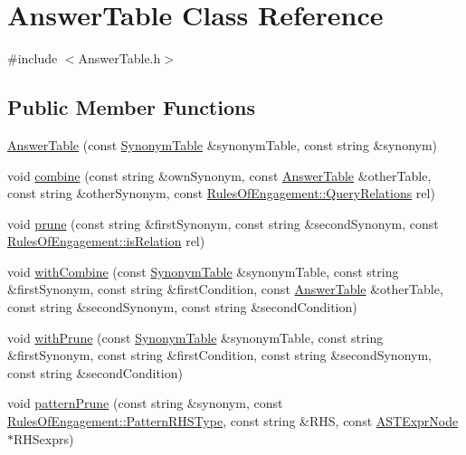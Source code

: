 \hypertarget{class_answer_table}{\section{Answer\-Table Class Reference}
\label{class_answer_table}
}


{\ttfamily \#include $<$Answer\-Table.\-h$>$}

\subsection*{Public Member Functions}
\begin{DoxyCompactItemize}
\item 
\hyperlink{class_answer_table_a01b3a71cd50d9ebd513068463650c34f}{Answer\-Table} (const \hyperlink{class_synonym_table}{Synonym\-Table} \&synonym\-Table, const string \&synonym)
\item 
void \hyperlink{class_answer_table_a7da446da9661e0d041cdf418adf98512}{combine} (const string \&own\-Synonym, const \hyperlink{class_answer_table}{Answer\-Table} \&other\-Table, const string \&other\-Synonym, const \hyperlink{class_rules_of_engagement_a5e08db2a0638b98dbb06ad923a33d817}{Rules\-Of\-Engagement\-::\-Query\-Relations} rel)
\item 
void \hyperlink{class_answer_table_a5c3bbb34b61b0dc49edcf62c817c994a}{prune} (const string \&first\-Synonym, const string \&second\-Synonym, const \hyperlink{class_rules_of_engagement_aad838c0ef69d7c4ee9bef23a431ff6c1}{Rules\-Of\-Engagement\-::is\-Relation} rel)
\item 
void \hyperlink{class_answer_table_affa20cce217db5e4618490224c32ad22}{with\-Combine} (const \hyperlink{class_synonym_table}{Synonym\-Table} \&synonym\-Table, const string \&first\-Synonym, const string \&first\-Condition, const \hyperlink{class_answer_table}{Answer\-Table} \&other\-Table, const string \&second\-Synonym, const string \&second\-Condition)
\item 
void \hyperlink{class_answer_table_af420ffab72e6f473cd09f577aac7e518}{with\-Prune} (const \hyperlink{class_synonym_table}{Synonym\-Table} \&synonym\-Table, const string \&first\-Synonym, const string \&first\-Condition, const string \&second\-Synonym, const string \&second\-Condition)
\item 
void \hyperlink{class_answer_table_a476cd4e95ee3dcd392d6d9bb66240cc5}{pattern\-Prune} (const string \&synonym, const \hyperlink{class_rules_of_engagement_a97613ded2253a252de010070d7c54ac1}{Rules\-Of\-Engagement\-::\-Pattern\-R\-H\-S\-Type}, const string \&R\-H\-S, const \hyperlink{class_a_s_t_expr_node}{A\-S\-T\-Expr\-Node} $\ast$R\-H\-Sexprs)

\end{DoxyCompactItemize}
